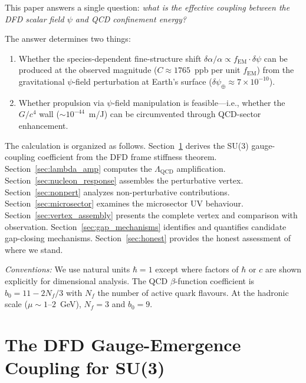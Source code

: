 \documentclass[aps,prd,twocolumn,superscriptaddress,floatfix,nofootinbib]{revtex4-2}
\newcommand{\LQCD}{\Lambda_{\mathrm{QCD}}}
\newcommand{\fEM}{f_{\mathrm{EM}}}
\newcommand{\dpsi}{\delta\psi}
\newcommand{\alphafine}{\alpha}
\begin{document}
This paper answers a single question: \emph{what is the effective coupling
between the DFD scalar field $\psi$ and QCD confinement energy?}

The answer determines two things:
\begin{enumerate}
\item Whether the species-dependent fine-structure shift
$\delta\alphafine/\alphafine \propto \fEM \cdot \dpsi$ can be produced at the
observed magnitude ($C \approx 1765$~ppb per unit $\fEM$) from the
gravitational $\psi$-field perturbation at Earth's surface
($\dpsi_\oplus \approx 7 \times 10^{-10}$).

\item Whether propulsion via $\psi$-field manipulation is feasible---i.e.,
whether the $G/c^4$ wall ($\sim 10^{-44}$~m/J) can be circumvented through
QCD-sector enhancement.
\end{enumerate}

The calculation is organized as follows. Section~\ref{sec:gauge_emergence}
derives the SU(3) gauge-coupling coefficient from the DFD frame stiffness
theorem. Section~\ref{sec:lambda_amp} computes the $\LQCD$ amplification.
Section~\ref{sec:nucleon_response} assembles the perturbative vertex.
Section~\ref{sec:nonpert} analyzes non-perturbative contributions.
Section~\ref{sec:microsector} examines the microsector UV behaviour.
Section~\ref{sec:vertex_assembly} presents the complete vertex and
comparison with observation. Section~\ref{sec:gap_mechanisms} identifies and
quantifies candidate gap-closing mechanisms. Section~\ref{sec:honest}
provides the honest assessment of where we stand.

\emph{Conventions:} We use natural units $\hbar = 1$ except where factors of
$\hbar$ or $c$ are shown explicitly for dimensional analysis. The QCD
$\beta$-function coefficient is $b_0 = 11 - 2N_f/3$ with $N_f$ the number
of active quark flavours. At the hadronic scale ($\mu \sim 1$--$2$~GeV),
$N_f = 3$ and $b_0 = 9$.


\section{The DFD Gauge-Emergence Coupling for SU(3)}\label{sec:gauge_emergence}
\end{document}
